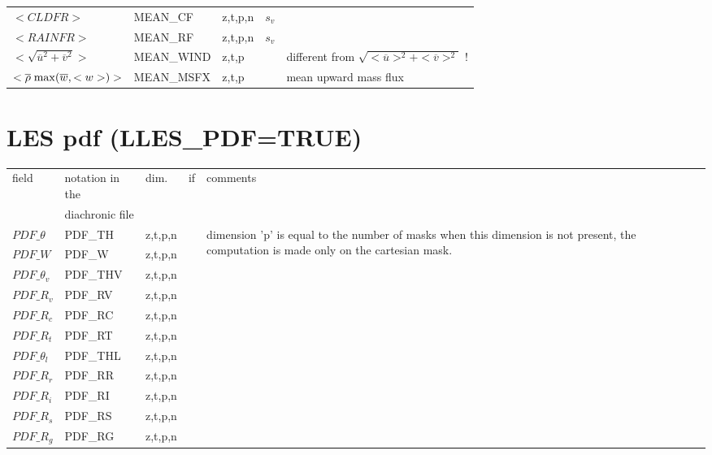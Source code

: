 \begin{center}
\begin{makeimage}
\begin{tabular}{||p{6cm}|>{\centering}p{2.5cm}|>{\centering}p{1.5cm}|>{\centering}p{0.5cm}|p{5cm }||}
\cline{1-4}
$<CLDFR>$   & MEAN\_CF &z,t,p,n &  $s_v$  &\\
\cline{1-4}
$<RAINFR>$   & MEAN\_RF &z,t,p,n &  $s_v$  &\\
\hline
$<\sqrt{\overline{u}^2+\overline{v}^2}>$   & MEAN\_WIND &z,t,p &   & different from $\sqrt{<\overline{u}>^2+<\overline{v}>^2}$ !\\
\hline
$<\overline{\rho} \;{\rm max}(\overline{w},<w>) >$  & MEAN\_MSFX &z,t,p &   & mean upward mass flux\\
\hline
\hline
\end{tabular}
\end{makeimage}
\end{center}

\newpage
\section{LES pdf (LLES\_PDF=TRUE)}

\begin{center}
\begin{makeimage}
\begin{tabular}{||p{6cm}|>{\centering}p{2.5cm}|>{\centering}p{1.5cm}|>{\centering}p{0.5cm}|p{5cm }||}
\hline
\hline
field & notation in the & dim. & if    & comments \\
      & diachronic file & &  & \\
\hline
\hline
$PDF\_\theta$ & PDF\_TH & z,t,p,n & &\multirow{11}{5cm}{dimension 'p' is equal to the  number of masks when this dimension is not present, the computation is made only on the cartesian mask.} \\
\cline{1-4}
$PDF\_W$ & PDF\_W &z,t,p,n &   &  \\
\cline{1-4}
$PDF\_\theta_v$ & PDF\_THV &z,t,p,n &   & \\
\cline{1-4}
$PDF\_R_v$ & PDF\_RV &z,t,p,n &   &  \\
\cline{1-4}
$PDF\_R_c$ & PDF\_RC &z,t,p,n &   &\\
\cline{1-4}
$PDF\_R_t$ & PDF\_RT &z,t,p,n &   &\\
\cline{1-4}
$PDF\_\theta_l$ & PDF\_THL &z,t,p,n &   &\\
\cline{1-4}
$PDF\_R_r$ & PDF\_RR &z,t,p,n &   &\\
\cline{1-4}
$PDF\_R_i$ & PDF\_RI &z,t,p,n &   &\\
\cline{1-4}
$PDF\_R_s$ & PDF\_RS &z,t,p,n &   &\\
\cline{1-4}
$PDF\_R_g$ & PDF\_RG &z,t,p,n &   &\\
\hline
\hline
\end{tabular}
\end{makeimage}
\end{center}

